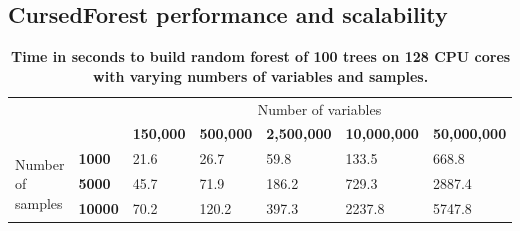 \documentclass[10pt,a4paper]{article}  %
\newcommand{\cursedforest}{{\sc CursedForest}}
\begin{document}
\subsection{CursedForest performance and scalability}

  


\begin{table}[!ht]
\centering
\caption{
{\bf Time in seconds to build random forest of 100
  trees on 128 CPU cores with varying numbers of variables and samples.}}
\begin{tabular}{|l|l||l|l|l|l|l|}
\hline
\multicolumn{2}{|l||}{\multirow{2}{*}{}}               & \multicolumn{5}{c|}{Number of variables}  \\
\cline{3-7}
\multicolumn{2}{|l||}{}                                & \bf{150,000} & \bf{500,000} & \bf{2,500,000}  & \bf{10,000,000} & \bf{50,000,000} \\
\hline                                                            
\multirow{4}{*}{Number of samples}                          & \bf{1000} &  21.6 & 26.7 & 59.8 & 133.5 & 668.8 \\
                                                            & \bf{5000} & 45.7 & 71.9 & 186.2 & 729.3 & 2887.4 \\
                                                            & \bf{10000} & 70.2 & 120.2 & 397.3 & 2237.8 & 5747.8 \\
\hline
\end{tabular}
\begin{flushleft} 
\end{flushleft}
\label{table10}
\end{table}
\end{document}
